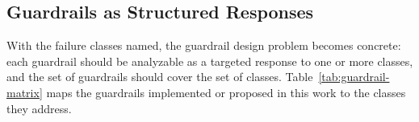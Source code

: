 \subsection{Guardrails as Structured Responses}
\label{sec:taxonomy-guardrails}

With the failure classes named, the guardrail design problem becomes
concrete: each guardrail should be analyzable as a targeted response
to one or more classes, and the set of guardrails should cover the
set of classes.  Table~\ref{tab:guardrail-matrix} maps the guardrails
implemented or proposed in this work to the classes they address.

\begin{table}[t]
  \centering
  \small
  \caption{Guardrails (rows) by hallucination class (columns).
    $\bullet$ = primary target, $\circ$ = secondary effect.  P1 and
    P2 (G-1, G-2) are implemented in the guardrail-applied run reported in
    Section~\ref{sec:results}; P3 (G-3), textual labelling (G-5),
    perturbation voting (G-4), hollow rings (G-6), and directional
    bisection (G-7) are future work targeting visual grounding
    (H-1..H-7).}
  \label{tab:guardrail-matrix}
\end{table}

